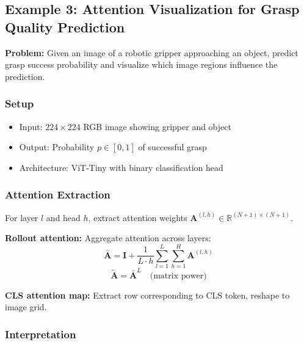 
\subsection{Example 3: Attention Visualization for Grasp Quality Prediction}

\textbf{Problem:} Given an image of a robotic gripper approaching an object, predict grasp success probability and visualize which image regions influence the prediction.

\subsubsection{Setup}

\begin{itemize}
    \item Input: $224 \times 224$ RGB image showing gripper and object
    \item Output: Probability $p \in [0, 1]$ of successful grasp
    \item Architecture: ViT-Tiny with binary classification head
\end{itemize}

\subsubsection{Attention Extraction}

For layer $l$ and head $h$, extract attention weights $\mathbf{A}^{(l,h)} \in \mathbb{R}^{(N+1) \times (N+1)}$.

\textbf{Rollout attention:} Aggregate attention across layers:
\begin{equation}
\bar{\mathbf{A}} = \mathbf{I} + \frac{1}{L \cdot h} \sum_{l=1}^{L} \sum_{h=1}^{H} \mathbf{A}^{(l,h)}
\label{eq:rollout_init}
\end{equation}
\begin{equation}
\tilde{\mathbf{A}} = \bar{\mathbf{A}}^L \quad \text{(matrix power)}
\label{eq:rollout_power}
\end{equation}

\textbf{CLS attention map:} Extract row corresponding to CLS token, reshape to image grid.

\subsubsection{Interpretation}

